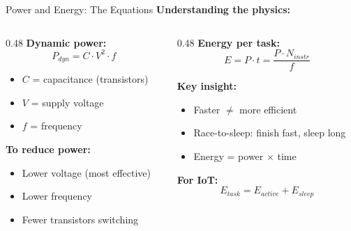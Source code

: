 \documentclass[aspectratio=169,11pt]{beamer}
\begin{document}
\begin{frame}{Power and Energy: The Equations}
    \textbf{Understanding the physics:}
    
    \vspace{0.3cm}
    \begin{columns}[T]
        \begin{column}{0.48\textwidth}
            \textbf{Dynamic power:}
            \[P_{dyn} = C \cdot V^2 \cdot f\]
            \begin{itemize}
                \item $C$ = capacitance (transistors)
                \item $V$ = supply voltage
                \item $f$ = frequency
            \end{itemize}
            
            \vspace{0.2cm}
            \textbf{To reduce power:}
            \begin{itemize}
                \item Lower voltage (most effective)
                \item Lower frequency
                \item Fewer transistors switching
            \end{itemize}
        \end{column}
        \begin{column}{0.48\textwidth}
            \textbf{Energy per task:}
            \[E = P \cdot t = \frac{P \cdot N_{instr}}{f}\]
            
            \vspace{0.2cm}
            \textbf{Key insight:}
            \begin{itemize}
                \item Faster $\neq$ more efficient
                \item Race-to-sleep: finish fast, sleep long
                \item Energy = power $\times$ time
            \end{itemize}
            
            \vspace{0.2cm}
            \textbf{For IoT:}
            \[E_{task} = E_{active} + E_{sleep}\]
        \end{column}
    \end{columns}
\end{frame}
\end{document}
